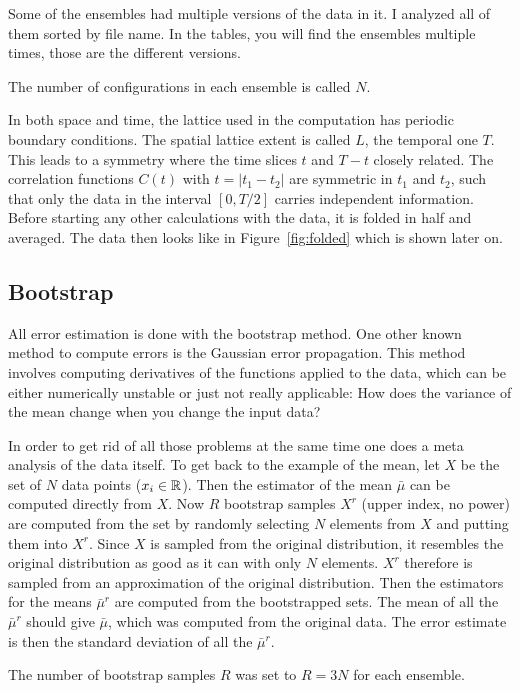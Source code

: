 \documentclass[11pt, english, fleqn, DIV=10, headinclude]{scrartcl}
\begin{document}
Some of the ensembles had multiple versions of the data in it. I analyzed all
of them sorted by file name. In the tables, you will find the ensembles
multiple times, those are the different versions.

The number of configurations in each ensemble is called $N$.

In both space and time, the lattice used in the computation has periodic
boundary conditions. The spatial lattice extent is called $L$, the temporal one
$T$. This leads to a symmetry where the time slices $t$ and $T-t$ closely
related. The correlation functions $C(t)$ with $t = |t_1 - t_2|$ are symmetric
in $t_1$ and $t_2$, such that only the data in the interval $[0, T/2]$ carries
independent information. Before starting any other calculations with the data,
it is folded in half and averaged. The data then looks like in
Figure~\ref{fig:folded} which is shown later on.

\subsection{Bootstrap}
\label{sec:bootstrap}

All error estimation is done with the bootstrap method. One other known method
to compute errors is the Gaussian error propagation. This method involves
computing derivatives of the functions applied to the data, which can be either
numerically unstable or just not really applicable: How does the variance of
the mean change when you change the input data?

In order to get rid of all those problems at the same time one does a meta
analysis of the data itself. To get back to the example of the mean, let $X$ be
the set of $N$ data points ($x_i \in \mathbb R$). Then the estimator of the mean
$\bar\mu$ can be computed directly from $X$. Now $R$ bootstrap samples $X^r$
(upper index, no power) are computed from the set by randomly selecting $N$
elements from $X$ and putting them into $X^r$. Since $X$ is sampled from the
original distribution, it resembles the original distribution as good as it can
with only $N$ elements. $X^r$ therefore is sampled from an approximation of the
original distribution. Then the estimators for the means $\bar\mu^r$ are
computed from the bootstrapped sets. The mean of all the $\bar\mu^r$ should
give $\bar\mu$, which was computed from the original data. The error estimate
is then the standard deviation of all the $\bar\mu^r$.

The number of bootstrap samples $R$ was set to $R = 3N$ for each ensemble.
\end{document}
